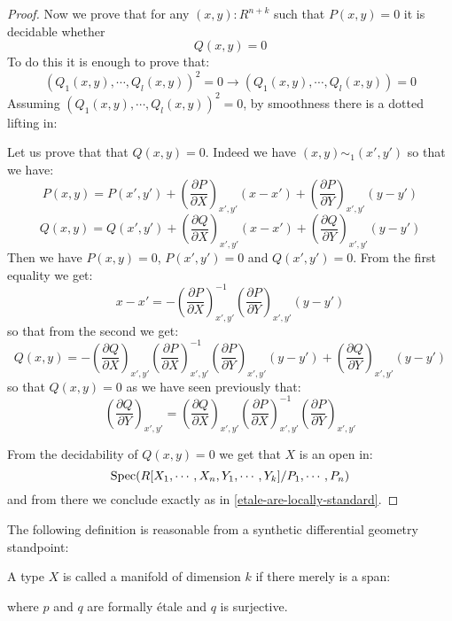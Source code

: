 \begin{proof}
Now we prove that for any $(x,y):R^{n+k}$ such that $P(x,y)=0$ it is decidable whether
\[Q(x,y)=0 \] 
To do this it is enough to prove that:
\[(Q_1(x,y),\cdots,Q_l(x,y))^2=0 \to (Q_1(x,y),\cdots,Q_l(x,y))=0\]
Assuming $(Q_1(x,y),\cdots,Q_l(x,y))^2=0$, by smoothness there is a dotted lifting in:
 \begin{center}
\end{center}
Let us prove that that $Q(x,y) = 0$. Indeed we have $(x,y) \sim_1 (x',y')$ so that we have:
\[P(x,y) = P(x',y')+ \left(\frac{\partial P}{\partial X}\right)_{x',y'}(x-x') + \left(\frac{\partial P}{\partial Y}\right)_{x',y'}(y-y') \]
\[Q(x,y) = Q(x',y')+ \left(\frac{\partial Q}{\partial X}\right)_{x',y'}(x-x') + \left(\frac{\partial Q}{\partial Y}\right)_{x',y'}(y-y') \]
Then we have $P(x,y) = 0$, $P(x',y')=0$ and $Q(x',y') = 0$. From the first equality we get:
\[x-x' =  -\left(\frac{\partial P}{\partial X}\right)_{x',y'}^{-1}\left(\frac{\partial P}{\partial Y}\right)_{x',y'}(y-y')\]
so that from the second we get:
\[Q(x,y) = -\left(\frac{\partial Q}{\partial X}\right)_{x',y'}\left(\frac{\partial P}{\partial X}\right)_{x',y'}^{-1}\left(\frac{\partial P}{\partial Y}\right)_{x',y'}(y-y') + \left(\frac{\partial Q}{\partial Y}\right)_{x',y'}(y-y')\]
so that $Q(x,y)=0$ as we have seen previously that:
\[\left(\frac{\partial Q}{\partial Y}\right)_{x',y'} = \left(\frac{\partial Q}{\partial X}\right)_{x',y'}\left(\frac{\partial P}{\partial X}\right)_{x',y'}^{-1} \left(\frac{\partial P}{\partial Y}\right)_{x',y'} \]

From the decidability of $Q(x,y)=0$ we get that $X$ is an open in:
\[\operatorname{Spec}(R[X_1,\cdots,X_n,Y_1,\cdots,Y_k]/P_1,\cdots,P_n)\]
and from there we conclude exactly as in \cref{etale-are-locally-standard}.
\end{proof}

The following definition is reasonable from a synthetic differential geometry standpoint:

\begin{definition}
A type $X$ is called a manifold of dimension $k$ if there merely is a span:
 \begin{center}
\end{center}
where $p$ and $q$ are formally étale and $q$ is surjective.
\end{definition}

